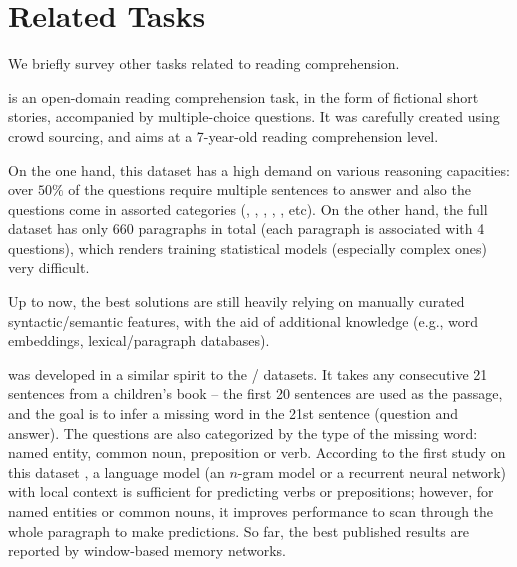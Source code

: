 
\section{Related Tasks}

We briefly survey other tasks related to reading comprehension.

 \cite{richardson2013mctest} is an open-domain reading comprehension task, in the form of fictional short stories, accompanied by multiple-choice questions. It was carefully created using crowd sourcing, and aims at a 7-year-old reading comprehension level.

On the one hand, this dataset has a high demand on various reasoning capacities: over $50\%$ of the questions require multiple sentences to answer and also the questions come in assorted categories (, , , , , etc). On the other hand, the full dataset has only 660 paragraphs in total (each paragraph is associated with 4 questions), which renders training statistical models (especially complex ones) very difficult.

Up to now, the best solutions \cite{sachan2015learning,wang2015machine} are still heavily relying on manually curated syntactic\slash semantic features, with the aid of additional knowledge (e.g., word embeddings, lexical\slash paragraph databases).

 \cite{hill2016goldilocks} was developed in a similar spirit to the \slash{} datasets. It takes any consecutive 21 sentences from a children's book -- the first 20 sentences are used as the passage, and the goal is to infer a missing word in the 21st sentence (question and answer). The questions are also categorized by the type of the missing word: named entity, common noun, preposition or verb. According to the first study on this dataset \cite{hill2016goldilocks}, a language model (an $n$-gram model or a recurrent neural network) with local context is sufficient for predicting verbs or prepositions; however, for named entities or common nouns, it improves performance to scan through the whole paragraph to make predictions. So far, the best published results are reported by window-based memory networks.

